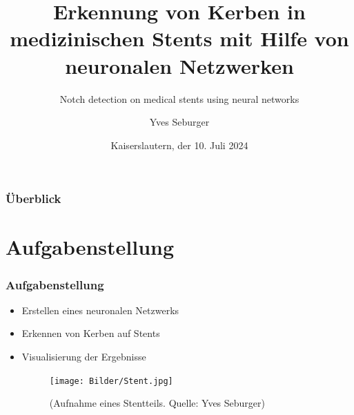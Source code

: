 \documentclass{beamer}
\title{Erkennung von Kerben in medizinischen Stents mit Hilfe von neuronalen Netzwerken}
\subtitle{\small Notch detection on medical stents using neural networks}
\author{Yves Seburger}
\date{Kaiserslautern, der 10. Juli 2024}
\institute{Hochschule Kaiserslautern\newline
Schoenstr. 11\newline
67659 Kaiserslautern}
\begin{document}
\frame{\titlepage}

\begin{frame}
\frametitle{Überblick}
\tableofcontents
\end{frame}

\section{Aufgabenstellung}
\begin{frame}[allowframebreaks]
\frametitle{Aufgabenstellung}
\begin{itemize}
    \item Erstellen eines neuronalen Netzwerks
    \item Erkennen von Kerben auf Stents
    \item Visualisierung der Ergebnisse
    \newline
    \begin{figure}
        \texttt{[image: Bilder/Stent.jpg]}
        \caption{(Aufnahme eines Stentteils. \scriptsize{Quelle: Yves Seburger})}
    \end{figure}  
\end{itemize}
\end{frame}
\end{document}
